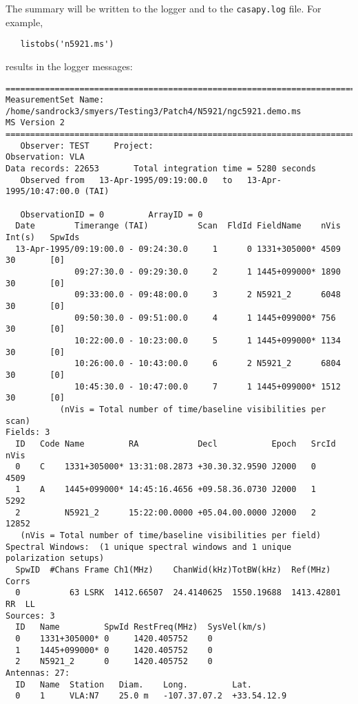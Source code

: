 The summary will be written to the logger and to the {\tt casapy.log}
file.  For example,
\small
\begin{verbatim}
   listobs('n5921.ms')
\end{verbatim}
\normalsize
results in the logger messages:
\small
\begin{verbatim}
================================================================================
MeasurementSet Name: /home/sandrock3/smyers/Testing3/Patch4/N5921/ngc5921.demo.ms
MS Version 2
================================================================================
   Observer: TEST     Project:   
Observation: VLA
Data records: 22653       Total integration time = 5280 seconds
   Observed from   13-Apr-1995/09:19:00.0   to   13-Apr-1995/10:47:00.0 (TAI)

   ObservationID = 0         ArrayID = 0
  Date        Timerange (TAI)          Scan  FldId FieldName    nVis   Int(s)   SpwIds
  13-Apr-1995/09:19:00.0 - 09:24:30.0     1      0 1331+305000* 4509   30       [0]
              09:27:30.0 - 09:29:30.0     2      1 1445+099000* 1890   30       [0]
              09:33:00.0 - 09:48:00.0     3      2 N5921_2      6048   30       [0]
              09:50:30.0 - 09:51:00.0     4      1 1445+099000* 756    30       [0]
              10:22:00.0 - 10:23:00.0     5      1 1445+099000* 1134   30       [0]
              10:26:00.0 - 10:43:00.0     6      2 N5921_2      6804   30       [0]
              10:45:30.0 - 10:47:00.0     7      1 1445+099000* 1512   30       [0]
           (nVis = Total number of time/baseline visibilities per scan) 
Fields: 3
  ID   Code Name         RA            Decl           Epoch   SrcId nVis   
  0    C    1331+305000* 13:31:08.2873 +30.30.32.9590 J2000   0     4509   
  1    A    1445+099000* 14:45:16.4656 +09.58.36.0730 J2000   1     5292   
  2         N5921_2      15:22:00.0000 +05.04.00.0000 J2000   2     12852  
   (nVis = Total number of time/baseline visibilities per field) 
Spectral Windows:  (1 unique spectral windows and 1 unique polarization setups)
  SpwID  #Chans Frame Ch1(MHz)    ChanWid(kHz)TotBW(kHz)  Ref(MHz)    Corrs   
  0          63 LSRK  1412.66507  24.4140625  1550.19688  1413.42801  RR  LL  
Sources: 3
  ID   Name         SpwId RestFreq(MHz)  SysVel(km/s) 
  0    1331+305000* 0     1420.405752    0            
  1    1445+099000* 0     1420.405752    0            
  2    N5921_2      0     1420.405752    0            
Antennas: 27:
  ID   Name  Station   Diam.    Long.         Lat.         
  0    1     VLA:N7    25.0 m   -107.37.07.2  +33.54.12.9  

\end{verbatim}
